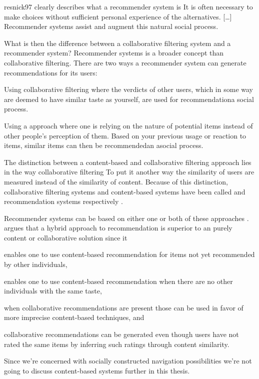\begin{fullquote}[\p{56}]{resnick97}{%
  clearly describes what a recommender system is}
  It is often necessary to make choices without sufficient
  personal experience of the alternatives.
  [\ldots]
  Recommender systems assist and augment this
  natural social process.
\end{fullquote}

What is then the difference between a collaborative
filtering system and a recommender system?
Recommender systems is a broader concept than collaborative
filtering. There are two ways a recommender system can generate
recommendations for its users:

\begin{enum}
  \item Using collaborative filtering
    where the verdicts of other users, which in some way are deemed to have
    similar taste as yourself, are used for recommendation\dash{}a social
    process.
  \item Using a  approach where one is relying on the
    nature of potential items instead of other people's perception of them.
    Based on your previous usage or reaction to items, similar items can then
    be recommended\dash{}an asocial process.
\end{enum}

The distinction between a content-based and collaborative filtering approach
lies in the way collaborative filtering  To put it another
way the similarity of users are measured instead of the similarity of content.
Because of this distinction, collaborative filtering systems
and content-based systems have been called  and
 recommendation systems respectively
\citep[]{greco04}.

Recommender systems can be based on either one or both of these approaches
\citep[]{herlocker00}. \citet[]{balabanovic97} argues that a
hybrid approach to recommendation is superior to an purely content or
collaborative solution since it
\begin{inparaenum}[(i)]
  \item enables one to use content-based recommendation for items
    not yet recommended by other individuals,
  \item enables one to use content-based recommendation when there are
    no other individuals with the same taste,
  \item when collaborative recommendations are present those can be
    used in favor of more imprecise content-based techniques, and
  \item collaborative recommendations can be generated even though users
    have not rated the same items by inferring such ratings through content
    similarity.
\end{inparaenum}
Since we're concerned with socially constructed navigation possibilities we're
not going to discuss content-based systems further in this thesis.

